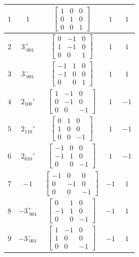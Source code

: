 \documentclass[fleqn,8pt]{jsarticle}
\begin{document}
\begin{longtable}{ccccc}
$ 1 $ & $ 1 $ & $ \begin{bmatrix} 1 & 0 & 0 \\ 0 & 1 & 0 \\ 0 & 0 & 1 \end{bmatrix} $ & $ 1 $ & $ 1 $ \\ \hline
$ 2 $ & $ 3^{+}_{\,\,001} $ & $ \begin{bmatrix} 0 & -1 & 0 \\ 1 & -1 & 0 \\ 0 & 0 & 1 \end{bmatrix} $ & $ 1 $ & $ 1 $ \\ \hline
$ 3 $ & $ 3^{-}_{\,\,001} $ & $ \begin{bmatrix} -1 & 1 & 0 \\ -1 & 0 & 0 \\ 0 & 0 & 1 \end{bmatrix} $ & $ 1 $ & $ 1 $ \\ \hline
$ 4 $ & $ 2{}_{100}{}' $ & $ \begin{bmatrix} 1 & -1 & 0 \\ 0 & -1 & 0 \\ 0 & 0 & -1 \end{bmatrix} $ & $ 1 $ & $ -1 $ \\ \hline
$ 5 $ & $ 2{}_{110}{}' $ & $ \begin{bmatrix} 0 & 1 & 0 \\ 1 & 0 & 0 \\ 0 & 0 & -1 \end{bmatrix} $ & $ 1 $ & $ -1 $ \\ \hline
$ 6 $ & $ 2{}_{010}{}' $ & $ \begin{bmatrix} -1 & 0 & 0 \\ -1 & 1 & 0 \\ 0 & 0 & -1 \end{bmatrix} $ & $ 1 $ & $ -1 $ \\ \hline
$ 7 $ & $ -1 $ & $ \begin{bmatrix} -1 & 0 & 0 \\ 0 & -1 & 0 \\ 0 & 0 & -1 \end{bmatrix} $ & $ -1 $ & $ 1 $ \\ \hline
$ 8 $ & $ -3^{+}_{\,\,001} $ & $ \begin{bmatrix} 0 & 1 & 0 \\ -1 & 1 & 0 \\ 0 & 0 & -1 \end{bmatrix} $ & $ -1 $ & $ 1 $ \\ \hline
$ 9 $ & $ -3^{-}_{\,\,001} $ & $ \begin{bmatrix} 1 & -1 & 0 \\ 1 & 0 & 0 \\ 0 & 0 & -1 \end{bmatrix} $ & $ -1 $ & $ 1 $ \\ \hline

\end{longtable}
\end{document}
